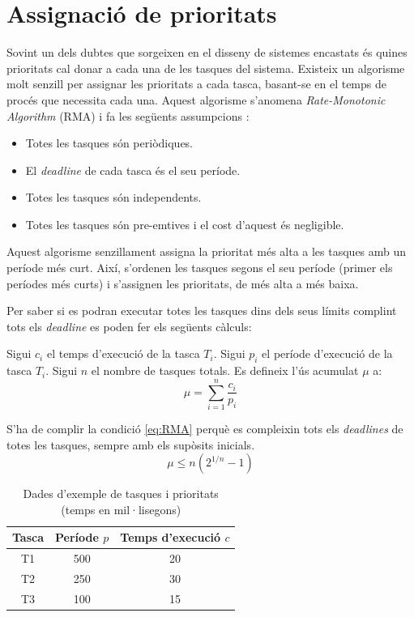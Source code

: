 \section{Assignació de prioritats}
\label{sec:priorities_RMA}
Sovint un dels dubtes que sorgeixen en el disseny de sistemes encastats és quines prioritats cal donar a cada una de les tasques del sistema. Existeix un algorisme molt senzill per assignar les prioritats a cada tasca, basant-se en el temps de procés que necessita cada una. Aquest algorisme s'anomena {\em Rate-Monotonic Algorithm} (RMA) i fa les següents assumpcions \cite{RMA_1}\cite[136]{EmbeddedBook_2}:
\begin{itemize}
 \item Totes les tasques són periòdiques.
 \item El {\em deadline} de cada tasca és el seu període.
 \item Totes les tasques són independents.
 \item Totes les tasques són pre-emtives i el cost d'aquest és negligible.
\end{itemize}

Aquest algorisme senzillament assigna la prioritat més alta a les tasques amb un període més curt. Així, s'ordenen les tasques segons el seu període (primer els períodes més curts) i s'assignen les prioritats, de més alta a més baixa.

Per saber si es podran executar totes les tasques dins dels seus límits complint tots els {\em deadline} es poden fer els següents càlculs:

Sigui $c_i$ el temps d'execució de la tasca $T_i$. Sigui $p_i$ el període d'execució de la tasca $T_i$. Sigui $n$ el nombre de tasques totals.
Es defineix l'ús acumulat $\mu$ a:
\begin{equation*}
 \mu = \sum^{n}_{i=1}\frac{c_i}{p_i}
\end{equation*}

S'ha de complir la condició \ref{eq:RMA} perquè es compleixin tots els {\em deadlines} de totes les tasques, sempre amb els supòsits inicials.
\begin{equation}
\label{eq:RMA}
 \mu \leq n (2^{1/n}-1)
\end{equation}

\begin{table}[b]
\caption{Dades d'exemple de tasques i prioritats (temps en mil·lisegons)}
\label{tb:RMA_example}
\centering
\begin{tabular}{|c|c|c|}
\hline
{\bf Tasca} & {\bf Període $p$} & {\bf Temps d'execució $c$}\\
\hline
T1 & 500 & 20\\
\hline
T2 & 250 & 30\\
\hline
T3 & 100 & 15\\
\hline
\end{tabular}
\end{table}

